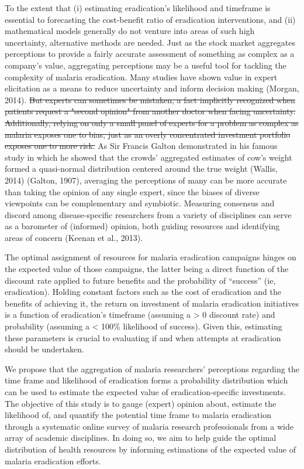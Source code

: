 \documentclass[]{article}
\begin{document}
To the extent that (i) estimating eradication's likelihood and timeframe
is essential to forecasting the cost-benefit ratio of eradication
interventions, and (ii) mathematical models generally do not venture
into areas of such high uncertainty, alternative methods are needed.
Just as the stock market aggregates perceptions to provide a fairly
accurate assessment of something as complex as a company's value,
aggregating perceptions may be a useful tool for tackling the complexity
of malaria eradication. Many studies have shown value in expert
elicitation as a means to reduce uncertainty and inform decision making
(Morgan, 2014).
\st{But experts can sometimes be mistaken, a fact implicitly recognized when patients request a "second opinion" from another doctor when facing uncertainty. Additionally, relying on only a small panel of experts for a problem as complex as malaria exposes one to bias, just as an overly concentrated investment portfolio exposes one to more risk.}
As Sir Francis Galton demonstrated in his famous study in which he
showed that the crowds' aggregated estimates of cow's weight formed a
quasi-normal distribution centered around the true weight (Wallis, 2014)
(Galton, 1907), averaging the perceptions of many can be more accurate
than taking the opinion of any single expert, since the biases of
diverse viewpoints can be complementary and symbiotic. Measuring
consensus and discord among disease-specific researchers from a variety
of disciplines can serve as a barometer of (informed) opinion, both
guiding resources and identifying areas of concern (Keenan et al.,
2013).

The optimal assignment of resources for malaria eradication campaigns
hinges on the expected value of those campaigns, the latter being a
direct function of the discount rate applied to future benefits and the
probability of ``success'' (ie, eradication). Holding constant factors
such as the cost of eradication and the benefits of achieving it, the
return on investment of malaria eradication initiatives is a function of
eradication's timeframe (assuming a \textgreater{} 0 discount rate) and
probability (assuming a \textless{} 100\% likelihood of success). Given
this, estimating these parameters is crucial to evaluating if and when
attempts at eradication should be undertaken.

We propose that the aggregation of malaria researchers' perceptions
regarding the time frame and likelihood of eradication forms a
probability distribution which can be used to estimate the expected
value of eradication-specific investments. The objective of this study
is to gauge (expert) opinion about, estimate the likelihood of, and
quantify the potential time frame to malaria eradication through a
systematic online survey of malaria research professionals from a wide
array of academic disciplines. In doing so, we aim to help guide the
optimal distribution of health resources by informing estimations of the
expected value of malaria eradication efforts.
\end{document}
